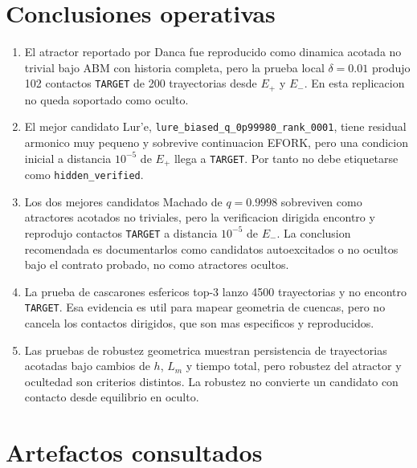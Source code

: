\documentclass[11pt]{article}
\newcommand{\status}[1]{\texttt{\small #1}}
\newcommand{\target}{\texttt{TARGET}}
\newcommand{\hiddenverified}{\texttt{hidden\_verified}}
\newcommand{\qmain}{0.9998}
\newcommand{\Eplus}{E_+}
\newcommand{\Eminus}{E_-}
\begin{document}
\section{Conclusiones operativas}

\begin{enumerate}
\item El atractor reportado por Danca fue reproducido como dinamica acotada no
trivial bajo ABM con historia completa, pero la prueba local \(\delta=0.01\)
produjo 102 contactos \target{} de 200 trayectorias desde \(\Eplus\) y
\(\Eminus\). En esta replicacion no queda soportado como oculto.

\item El mejor candidato Lur'e,
\status{lure\_biased\_q\_0p99980\_rank\_0001}, tiene residual armonico muy
pequeno y sobrevive continuacion EFORK, pero una condicion inicial a distancia
\(10^{-5}\) de \(\Eplus\) llega a \target{}. Por tanto no debe etiquetarse
como \hiddenverified.

\item Los dos mejores candidatos Machado de \(q=\qmain\) sobreviven como
atractores acotados no triviales, pero la verificacion dirigida encontro y
reprodujo contactos \target{} a distancia \(10^{-5}\) de \(\Eminus\). La
conclusion recomendada es documentarlos como candidatos autoexcitados o no
ocultos bajo el contrato probado, no como atractores ocultos.

\item La prueba de cascarones esfericos top-3 lanzo 4500 trayectorias y no
encontro \target{}. Esa evidencia es util para mapear geometria de cuencas, pero
no cancela los contactos dirigidos, que son mas especificos y reproducidos.

\item Las pruebas de robustez geometrica muestran persistencia de trayectorias
acotadas bajo cambios de \(h\), \(L_m\) y tiempo total, pero robustez del
atractor y ocultedad son criterios distintos. La robustez no convierte un
candidato con contacto desde equilibrio en oculto.
\end{enumerate}

\section{Artefactos consultados}
\end{document}
